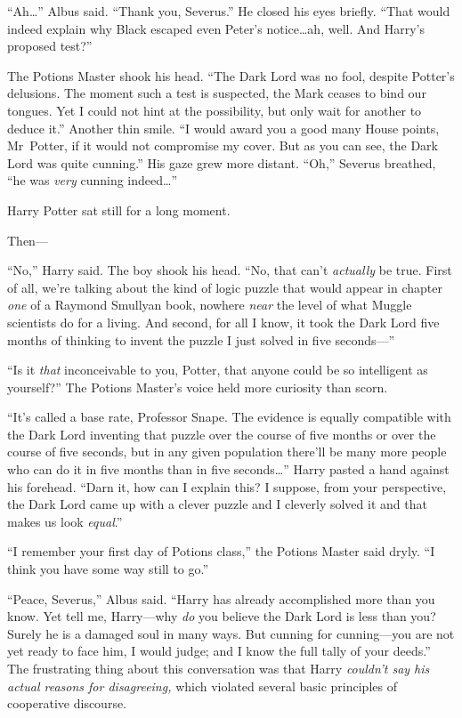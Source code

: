 “Ah…” Albus said. “Thank you, Severus.” He closed his eyes briefly. “That would indeed explain why Black escaped even Peter’s notice…ah, well. And Harry’s proposed test?”

The Potions Master shook his head. “The Dark Lord was no fool, despite Potter’s delusions. The moment such a test is suspected, the Mark ceases to bind our tongues. Yet I could not hint at the possibility, but only wait for another to deduce it.” Another thin smile. “I would award you a good many House points, Mr~Potter, if it would not compromise my cover. But as you can see, the Dark Lord was quite cunning.” His gaze grew more distant. “Oh,” Severus breathed, “he was \emph{very} cunning indeed…”

Harry Potter sat still for a long moment.

Then—

“No,” Harry said. The boy shook his head. “No, that can’t \emph{actually} be true. First of all, we’re talking about the kind of logic puzzle that would appear in chapter \emph{one} of a Raymond Smullyan book, nowhere \emph{near} the level of what Muggle scientists do for a living. And second, for all I know, it took the Dark Lord five months of thinking to invent the puzzle I just solved in five seconds—”

“Is it \emph{that} inconceivable to you, Potter, that anyone could be so intelligent as yourself?” The Potions Master’s voice held more curiosity than scorn.

“It’s called a base rate, Professor Snape. The evidence is equally compatible with the Dark Lord inventing that puzzle over the course of five months or over the course of five seconds, but in any given population there’ll be many more people who can do it in five months than in five seconds…” Harry pasted a hand against his forehead. “Darn it, how can I explain this? I suppose, from your perspective, the Dark Lord came up with a clever puzzle and I cleverly solved it and that makes us look \emph{equal}.”

“I remember your first day of Potions class,” the Potions Master said dryly. “I think you have some way still to go.”

“Peace, Severus,” Albus said. “Harry has already accomplished more than you know. Yet tell me, Harry—why \emph{do} you believe the Dark Lord is less than you? Surely he is a damaged soul in many ways. But cunning for cunning—you are not yet ready to face him, I would judge; and I know the full tally of your deeds.” \later The frustrating thing about this conversation was that Harry \emph{couldn’t say his actual reasons for disagreeing,} which violated several basic principles of cooperative discourse.

